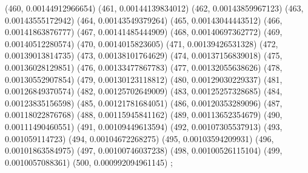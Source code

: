 {					(460, 0.00144912966654)
					(461, 0.00144139834012)
					(462, 0.00143859967123)
					(463, 0.00143555172942)
					(464, 0.00143549379264)
					(465, 0.00143044443512)
					(466, 0.00141863876777)
					(467, 0.00141485444909)
					(468, 0.00140697362772)
					(469, 0.00140512280574)
					(470, 0.0014015823605)
					(471, 0.00139426531328)
					(472, 0.00139013814735)
					(473, 0.00138101764629)
					(474, 0.00137156839018)
					(475, 0.00136028129851)
					(476, 0.00133477867783)
					(477, 0.00132055638626)
					(478, 0.00130552907854)
					(479, 0.00130123118812)
					(480, 0.00129030229337)
					(481, 0.00126849370574)
					(482, 0.00125702649009)
					(483, 0.00125257328685)
					(484, 0.00123835156598)
					(485, 0.00121781684051)
					(486, 0.00120353289096)
					(487, 0.00118022876768)
					(488, 0.00115945841162)
					(489, 0.00113652354679)
					(490, 0.00111490460551)
					(491, 0.00109449613594)
					(492, 0.00107305537913)
					(493, 0.001059114723)
					(494, 0.00104672268275)
					(495, 0.00103594209931)
					(496, 0.00101863584975)
					(497, 0.00100746037238)
					(498, 0.00100526115104)
					(499, 0.0010057088361)
					(500, 0.000992094961145)
				};
